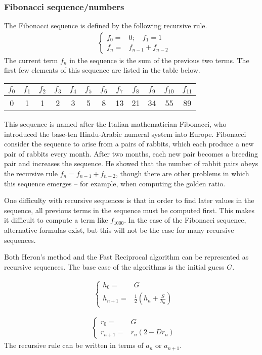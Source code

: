 \subsubsection*{Fibonacci sequence/numbers}
The Fibonacci sequence is defined by the following recursive rule.
\begin{align*}
  &\begin{cases}
    f_0=&0; \quad f_1=1\\
    f_n=&f_{n-1}+f_{n-2}
  \end{cases}
\end{align*}
The current term $f_n$ in the sequence is the sum of the previous two terms. The first few elements of this sequence are listed in the table below.
\begin{center}
\begin{tabular}{|c|c|c|c|c|c|c|c|c|c|c|c|}
\hline
$f_0$ & $f_1$ & $f_2$ & $f_3$ & $f_4$ & $f_5$ & $f_6$ & $f_7$ & $f_8$ & $f_9$ & $f_{10}$ & $f_{11}$  \\
\hline
0 & 1 & 1 & 2& 3 & 5 & 8 & 13 & 21 & 34 & 55 & 89 \\
\hline
\end{tabular}
\end{center}
This sequence is named after the Italian mathematician Fibonacci, who introduced the base-ten Hindu-Arabic numeral system into Europe. Fibonacci consider the sequence to arise from a pairs of rabbits, which each produce a new pair of rabbits every month. After two months, each new pair becomes a breeding pair and increases the sequence. He showed that the number of rabbit pairs obeys the recursive rule $f_n=f_{n-1}+f_{n-2}$, though there are other problems in which this sequence emerges -- for example, when computing the golden ratio.

One difficulty with recursive sequences is that in order to find later values in the sequence, all previous terms in the sequence must be computed first. This makes it difficult to compute a term like $f_{1000}$. In the case of the Fibonacci sequence, alternative formulas exist, but this will not be the case for many recursive sequences.

Both Heron's method and the Fast Reciprocal algorithm can be represented as recursive sequences. The base case of the algorithms is the initial guess $G$.

\begin{align*}
  &\begin{cases}
    h_0=&G\\
    h_{n+1}=&\frac{1}{2} \left( h_n + \frac{S}{h_n} \right)
  \end{cases}
\end{align*}

\begin{align*}
  &\begin{cases}
    r_0=&G\\
    r_{n+1}=&r_n \left( 2-D r_n \right)
  \end{cases}
\end{align*}
The recursive rule can be written in terms of $a_{n}$ or $a_{n+1}$.

